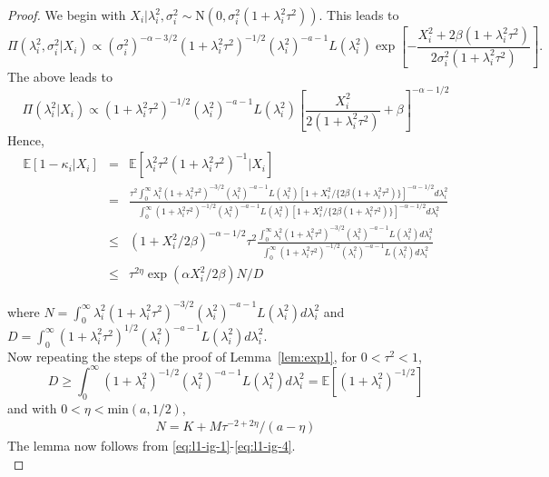 \documentclass[sn-basic]{sn-jnl}%
\theoremstyle{thmstyleone}%
\begin{document}
\begin{proof}
We begin with $X_i|\lambda_i^2,\sigma_i^2\sim\mbox{N}(0,\sigma_i^2
(1+\lambda_i^2\tau^2))$. This leads to
\[
\Pi(\lambda_i^2,\sigma_i^2|X_i) \propto
(\sigma_i^2)^{-\alpha - 3/2}(1+\lambda_i^2\tau^2)
^{-1/2} (\lambda_i^2)^{-a-1}
L(\lambda_i^2) \exp \left[- \frac{X_i^2 + 2\beta (1+\lambda_i^2\tau^2)}{2\sigma_i^2 (1+\lambda_i^2\tau^2)} \right].
\]
\noindent
The above leads to
\begin{equation}
\Pi(\lambda_i^2|X_i) \propto
(1+\lambda_i^2\tau^2)^{-1/2} (\lambda_i^2)^{-a-1} L(\lambda_i^2) \left[ \frac{X_i^2}{2(1+\lambda_i^2\tau^2)} + \beta \right]^{-\alpha - 1/2}
\label{eq:l1-ig-1}
\end{equation}
Hence,
\begin{eqnarray}
\mathbb{E}[1-\kappa_i|X_i]
&=&
\mathbb{E}[\lambda_i^2\tau^2(1+\lambda_i^2\tau^2)^{-1}|X_i] \nonumber \\
&=&
\frac{\tau^2 \int_0^\infty \lambda_i^2 (1+\lambda_i^2\tau^2)^{-3/2} (\lambda_i^2)^{-a-1} L(\lambda_i^2) [1 + X_i^2/\{ 2\beta(1+\lambda_i^2\tau^2) \}]^{-\alpha-1/2} d\lambda_i^2}{\int_0^\infty (1+\lambda_i^2\tau^2)^{-1/2} (\lambda_i^2)^{-a-1} L(\lambda_i^2) [1 + X_i^2/\{ 2\beta(1+\lambda_i^2\tau^2) \}]^{-\alpha-1/2} d\lambda_i^2} \nonumber \\
&\leq&
(1+X_i^2/2\beta)^{-\alpha-1/2} \tau^2 \frac{\int_0^\infty \lambda_i^2 (1+\lambda_i^2\tau^2)^{-3/2} (\lambda_i^2)^{-a-1} L(\lambda_i^2) d\lambda_i^2}{\int_0^\infty (1+\lambda_i^2\tau^2)^{-1/2} (\lambda_i^2)^{-a-1} L(\lambda_i^2) d\lambda_i^2} \nonumber \\
&\leq&
\tau^{2\eta} \exp(\alpha X_i^2/2\beta) N/D
\label{eq:l1-ig-2}
\end{eqnarray}

where $N=\int_{0}^{\infty}\lambda_i^2(1+\lambda_i^2\tau^2)^{-3/2}
(\lambda_i^2)^{-a-1}L(\lambda_i^2)d\lambda_i^2$ and 
$D=\int_{0}^{\infty}(1+\lambda_i^2\tau^2)^{1/2}(\lambda_i^2)^{-a-1}
L(\lambda_i^2)d\lambda_i^2$.\\

\noindent
Now repeating the steps of the proof of Lemma~\ref{lem:exp1}, for $0<\tau^2<1$, 
\begin{equation}
D\geq \int_0^\infty (1+\lambda_i^2)^{-1/2}(\lambda_i^2)^{-a-1}L(\lambda_i^2)d\lambda_i^2 = \mathbb{E}[(1+\lambda_i^2)^{-1/2}]
\label{eq:l1-ig-3}
\end{equation}
and with $0<\eta<\mbox{min}(a,1/2)$,
\begin{eqnarray}
N = K + M \tau^{-2+2\eta}/(a-\eta)
\label{eq:l1-ig-4}
\end{eqnarray}
\noindent
The lemma now follows from \eqref{eq:l1-ig-1}-\eqref{eq:l1-ig-4}.\\
\end{proof}
\end{document}

